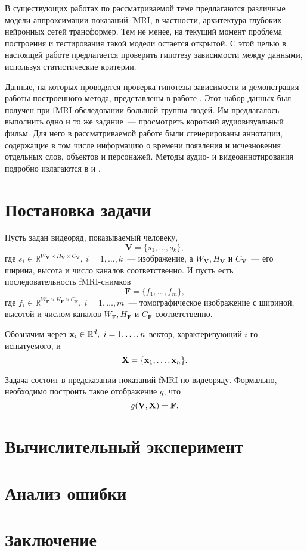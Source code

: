 \documentclass[a4paper, 12pt]{article}
\begin{document}
	В существующих работах по рассматриваемой теме предлагаются различные модели аппроксимации 
	показаний fMRI, в частности, архитектура глубоких нейронных сетей трансформер. Тем не менее,
	на текущий момент проблема построения и тестирования такой модели остается открытой.
	С этой целью в настоящей работе предлагается проверить гипотезу зависимости между данными, 
	используя статистические критерии.

	Данные, на которых проводятся проверка гипотезы зависимости и демонстрация работы построенного 
	метода, представлены в работе \citep{Berezutskaya2022}. Этот набор данных был получен при
	fMRI-обследовании большой группы людей. Им предлагалось выполнить одно и то же задание~---
	просмотреть короткий аудиовизуальный фильм. Для него в рассматриваемой работе были 
	сгенерированы аннотации, содержащие в том числе информацию о времени появления и исчезновения
	отдельных слов, объектов и персонажей. Методы аудио- и видеоаннотирования подробно излагаются в
	\citep{boersma2018praat} и \citep{Berezutskaya2020}. 

\section{Постановка задачи}

	Пусть задан видеоряд, показываемый человеку,
	\begin{equation}
		\mathbf{V} = \{s_1, \ldots, s_k\},
	\end{equation}
	где $s_i \in \mathbb{R}^{W_{\mathbf{V}} \times H_{\mathbf{V}} \times C_{\mathbf{V}}},
	\ i = 1, \ldots, k$~--- изображение, а $W_{\mathbf{V}}, H_{\mathbf{V}}$ и 
	$C_{\mathbf{V}}$~--- его ширина, высота и число каналов соответственно.
	И пусть есть последовательность fMRI-снимков
	\begin{equation}
		\mathbf{F} = \{f_1, \ldots, f_m\},
	\end{equation}
	где $f_i \in \mathbb{R}^{W_{\mathbf{F}} \times H_{\mathbf{F}} \times C_{\mathbf{F}}},
	\ i = 1, \ldots, m$~--- томографическое изображение с шириной, высотой и числом каналов
	$W_{\mathbf{F}}, H_{\mathbf{F}}$ и $C_{\mathbf{F}}$ соответственно.

	Обозначим через $\mathbf{x}_i \in \mathbb{R}^d,\ i = 1, \ldots, n$ вектор, характеризующий $i$-го 
	испытуемого, и
	\begin{equation}
		\mathbf{X} = \{\mathbf{x}_1, \ldots, \mathbf{x}_n\}.
	\end{equation}

	Задача состоит в предсказании показаний fMRI по видеоряду. Формально, необходимо построить
	такое отображение $g$, что
	\begin{equation}
		g(\mathbf{V}, \mathbf{X}) = \mathbf{F}.
	\end{equation}

\section{Вычислительный эксперимент}

\section{Анализ ошибки}

\section{Заключение}



\end{document}
